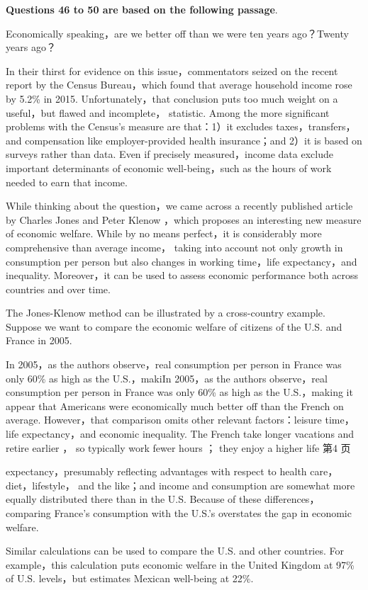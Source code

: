 \documentclass[UTF8,11pt]{ctexart}
\begin{document}
\textbf{Questions 46 to 50 are based on the following passage}.


Economically speaking，are we better off than we were ten years ago？Twenty years ago？


In their thirst for evidence on this issue，commentators seized on the recent report by the Census Bureau，which found that average household income rose by 5.2\% in 2015. Unfortunately，that conclusion puts too much weight on a useful，but flawed and incomplete， statistic. Among the more significant problems with the Census’s measure are that：1）it excludes taxes，transfers，and compensation like employer-provided health insurance；and 2）it is based on surveys rather than data. Even if precisely measured，income data exclude important determinants of economic well-being，such as the hours of work needed to earn that income.


While thinking about the question，we came across a recently published article by Charles Jones and Peter Klenow ，which proposes an interesting new measure of economic welfare. While by no means perfect，it is considerably more comprehensive than average income， taking into account not only growth in consumption per person but also changes in working time，life expectancy，and inequality. Moreover，it can be used to assess economic performance both across countries and over time.


The Jones-Klenow method can be illustrated by a cross-country example. Suppose we want to compare the economic welfare of citizens of the U.S. and France in 2005.


In 2005，as the authors observe，real consumption per person in France was only 60\% as high as the U.S.，makiIn 2005，as the authors observe，real consumption per person in France was only 60\% as high as the U.S.，making it appear that Americans were economically much better off than the French on average. However，that comparison omits other relevant factors：leisure time，life expectancy，and economic inequality. The French take longer vacations and retire earlier ， so typically work fewer hours ； they enjoy a higher life 第4 页


expectancy，presumably reflecting advantages with respect to health care，diet，lifestyle， and the like；and income and consumption are somewhat more equally distributed there than in the U.S. Because of these differences，comparing France’s consumption with the U.S.’s overstates the gap in economic welfare.


Similar calculations can be used to compare the U.S. and other countries. For example，this calculation puts economic welfare in the United Kingdom at 97\% of U.S. levels，but estimates Mexican well-being at 22\%.
\end{document}
